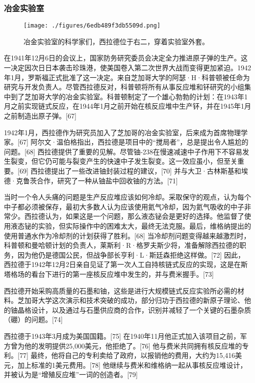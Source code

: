 \subsubsection{冶金实验室}
\begin{figure}[ht]
\centering
\texttt{[image: ./figures/6edb489f3db5509d.png]}
\caption{冶金实验室的科学家们，西拉德位于右二，穿着实验室外套。} \label{fig_Szilar_5}
\end{figure}
在1941年12月6日的会议上，国家防务研究委员会决定全力推进原子弹的生产。这一决定因次日日本袭击珍珠港，使美国卷入第二次世界大战而变得更加紧迫。1942年1月，罗斯福正式批准了这一决定。来自芝加哥大学的阿瑟·H·科普顿被任命为研究与开发负责人。尽管西拉德反对，科普顿将所有从事反应堆和钚研究的小组集中到了芝加哥大学的冶金实验室。科普顿制定了一个雄心勃勃的计划：在1943年1月之前实现链式反应，在1944年1月之前开始在核反应堆中生产钚，并在1945年1月之前制造出原子弹。[67]

1942年1月，西拉德作为研究员加入了芝加哥的冶金实验室，后来成为首席物理学家。[67] 阿尔文·温伯格指出，西拉德是项目中的“搅局者”，总是提出令人尴尬的问题。[68] 西拉德提供了重要的见解。尽管铀-238在慢速减速中子作用下不容易发生裂变，但它仍可能与裂变产生的快速中子发生裂变。这一效应虽小，但至关重要。[69] 西拉德提出了一些改进铀封装过程的建议，[70] 并与大卫·古林斯基和埃德·克鲁茨合作，研究了一种从铀盐中回收铀的方法。[71]

当时一个令人头痛的问题是生产反应堆应该如何冷却。采取保守的观点，认为每个中子都必须被保存，最初大多数人认为应该使用氦气冷却，因为氦气吸收的中子非常少。西拉德认为，如果这是一个问题，那么液态铋会是更好的选择。他监督了使用液态铋的实验，但实际操作中的困难太大，最终无法克服。最后，维格纳提出的使用普通水作为冷却剂的计划获得了胜利。[68] 当冷却剂问题变得越来越激烈时，科普顿和曼哈顿计划的负责人，莱斯利·R·格罗夫斯少将，准备解除西拉德的职务，因为他仍是德国公民，但战争部长亨利·L·斯廷森拒绝这样做。[72] 因此，西拉德于1942年12月2日亲自见证了第一次人工自持核链式反应的实现，这是在斯塔格场的看台下进行的第一座核反应堆中发生的，并与费米握手。[73]

西拉德开始采购高质量的石墨和铀，这些是进行大规模链式反应实验所必需的材料。芝加哥大学这次演示和技术突破的成功，部分归功于西拉德的新原子理论、他的铀晶格设计，以及通过与石墨供应商的合作，识别并减轻了一个关键的石墨杂质（硼）的问题。[74]

西拉德于1943年3月成为美国国籍。[75] 在1940年11月他正式加入该项目之前，军方曾为他的发明提供25,000美元，他拒绝了。[76] 他与费米共同拥有核反应堆的专利。[77] 最终，他将自己的专利卖给了政府，以报销他的费用，大约为15,416美元，加上标准的1美元费用。[78] 他继续与费米和维格纳一起从事核反应堆设计，并被认为是“增殖反应堆”一词的创造者。[79]

